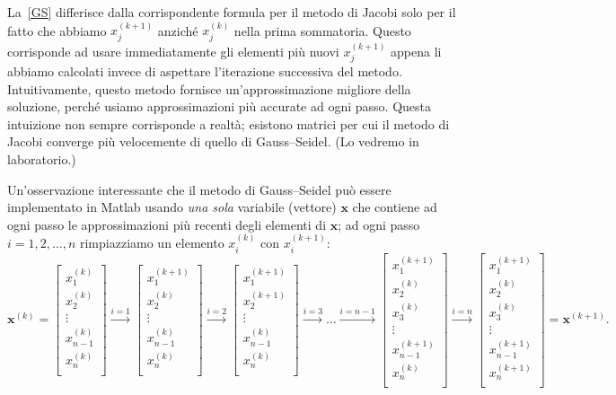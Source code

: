 \documentclass[a4paper]{report}
\theoremstyle{definiton}
\theoremstyle{remark}
\newcommand{\x}{\mathbf{x}}
\begin{document}
La~\eqref{GS} differisce dalla corrispondente formula per il metodo di Jacobi solo per il fatto che abbiamo $x_j^{(k+1)}$ anziché $x_j^{(k)}$ nella prima sommatoria. Questo corrisponde ad usare immediatamente gli elementi più nuovi $x_j^{(k+1)}$ appena li abbiamo calcolati invece di aspettare l'iterazione successiva del metodo. Intuitivamente, questo metodo fornisce un'approssimazione migliore della soluzione, perché usiamo approssimazioni più accurate ad ogni passo. Questa intuizione non sempre corrisponde a realtà; esistono matrici per cui il metodo di Jacobi converge più velocemente di quello di Gauss--Seidel. (Lo vedremo in laboratorio.)

Un'osservazione interessante che il metodo di Gauss--Seidel può essere implementato in Matlab usando \emph{una sola} variabile (vettore) $\x$ che contiene ad ogni passo le approssimazioni più recenti degli elementi di $\x$; ad ogni passo $i=1,2,\dots,n$ rimpiazziamo un elemento $x_i^{(k)}$ con $x_i^{(k+1)}$:
\[
\x^{(k)} = \begin{bmatrix}
    x^{(k)}_1\\ 
    x^{(k)}_2\\ 
    \vdots \\
    x^{(k)}_{n-1}\\ 
    x^{(k)}_n\\ 
\end{bmatrix} \stackrel{i=1}{\to}
\begin{bmatrix}
    x^{(k+1)}_1\\ 
    x^{(k)}_2\\ 
    \vdots \\
    x^{(k)}_{n-1}\\ 
    x^{(k)}_n\\ 
\end{bmatrix} \stackrel{i=2}{\to}
\begin{bmatrix}
    x^{(k+1)}_1\\ 
    x^{(k+1)}_2\\ 
    \vdots \\
    x^{(k)}_{n-1}\\ 
    x^{(k)}_n\\ 
\end{bmatrix} \stackrel{i=3}{\to}
\dots
\stackrel{i=n-1}{\to}
\begin{bmatrix}
    x^{(k+1)}_1\\ 
    x^{(k)}_2\\ 
    x^{(k)}_3\\ 
    \vdots \\
    x^{(k+1)}_{n-1}\\ 
    x^{(k)}_n\\ 
\end{bmatrix} \stackrel{i=n}{\to}
\begin{bmatrix}
    x^{(k+1)}_1\\ 
    x^{(k)}_2\\ 
    x^{(k)}_3\\ 
    \vdots \\
    x^{(k+1)}_{n-1}\\ 
    x^{(k+1)}_n\\ 
\end{bmatrix} = \x^{(k+1)}.
\]
\end{document}
